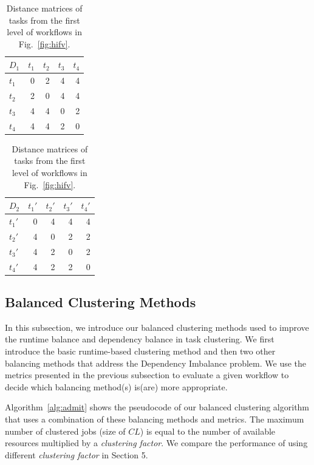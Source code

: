\documentclass[final,5p,times,twocolumn]{elsarticle}
\begin{document}
\begin{table}[htb]
	\footnotesize
	\centering
	\begin{tabular}{l|rrrr}
		$D_1$ & $t_1$ & $t_2$ & $t_3$ &$t_4$\\
		\hline
		$t_1$ & 0 & 2 & 4 & 4 \\
		$t_2$ & 2 & 0 & 4 & 4 \\
		$t_3$ & 4 & 4 & 0 & 2\\
		$t_4$ & 4 & 4 & 2 & 0 \\
	\end{tabular}
	\quad
	\begin{tabular}{l|rrrr}
		$D_2$ & $t_1'$ & $t_2'$ & $t_3'$ &$t_4'$\\
		\hline
		$t_1'$ & 0 & 4 & 4 & 4 \\
		$t_2'$ & 4 & 0 & 2 & 2 \\
		$t_3'$ & 4 & 2 & 0 & 2\\
		$t_4'$ & 4 & 2 & 2 & 0 \\
	\end{tabular}
	\caption{Distance matrices of tasks from the first level of workflows in Fig.~\ref{fig:hifv}.}
	\label{tab:1}
	\vspace{-20pt}
\end{table}


\subsection{Balanced Clustering Methods}
\label{sec:methods}
In this subsection, we introduce our balanced clustering methods used to improve the runtime balance and dependency balance in task clustering. We first introduce the basic runtime-based clustering method and then two other balancing methods that address the Dependency Imbalance problem. We use the metrics presented in the previous subsection to evaluate a given workflow to decide which balancing method(s) is(are) more appropriate. 

Algorithm~\ref{alg:admit} shows the pseudocode of our balanced clustering algorithm that uses a combination of these balancing methods and metrics.  The maximum number of clustered jobs (size of $CL$) is equal to the number of available resources multiplied by a \emph{clustering factor}. We compare the performance of using different \emph{clustering factor} in Section 5. 
\end{document}
